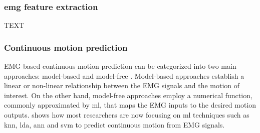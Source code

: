 \subsubsection{\acs{emg} feature extraction}

TEXT

\subsubsection{Continuous motion prediction}

EMG-based continuous motion prediction can be categorized into two main approaches: model-based and model-free \cite{EMGprediction}. Model-based approaches
establish a linear or non-linear relationship between the EMG signals and the motion of interest. On the other hand, model-free approaches
employ a numerical function, commonly approximated by \ac{ml}, that maps the EMG inputs to the desired motion outputs. \cite{ANNFuzzy} shows how most 
researchers are now focusing on \ac{ml} techniques such as \ac{knn}, \ac{lda}, \ac{ann} and \ac{svm} to predict continuous motion from EMG signals.